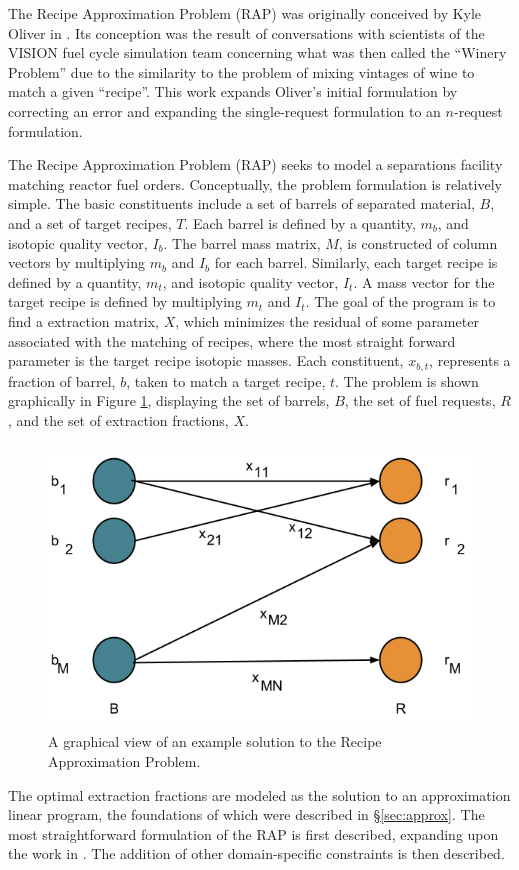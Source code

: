 The Recipe Approximation Problem (RAP) was originally conceived by Kyle Oliver
in \cite{oliver_geniusv2:_2009}. Its conception was the result of conversations
with scientists of the VISION fuel cycle simulation team \cite{vision2009}
concerning what was then called the ``Winery Problem'' due to the similarity to
the problem of mixing vintages of wine to match a given ``recipe''. This work
expands Oliver's initial formulation by correcting an error and expanding the
single-request formulation to an $n$-request formulation.

The Recipe Approximation Problem (RAP) seeks to model a separations facility
matching reactor fuel orders. Conceptually, the problem formulation is
relatively simple. The basic constituents include a set of barrels of separated
material, $B$, and a set of target recipes, $T$. Each barrel is defined by a
quantity, $m_b$, and isotopic quality vector, $I_b$. The barrel mass matrix,
$M$, is constructed of column vectors by multiplying $m_b$ and $I_b$ for each
barrel. Similarly, each target recipe is defined by a quantity, $m_t$, and
isotopic quality vector, $I_t$. A mass vector for the target recipe is defined
by multiplying $m_t$ and $I_t$. The goal of the program is to find a extraction
matrix, $X$, which minimizes the residual of some parameter associated with the
matching of recipes, where the most straight forward parameter is the target
recipe isotopic masses. Each constituent, $x_{b,t}$, represents a fraction of
barrel, $b$, taken to match a target recipe, $t$. The problem is shown
graphically in Figure \ref{fig:rap}, displaying the set of barrels, $B$, the set
of fuel requests, $R$, and the set of extraction fractions, $X$.

\begin{figure}[h]
  \begin{center}
    \includegraphics[height=7.5cm]{./chapters/research/rap.png}
  \caption{A graphical view of an example solution to the Recipe Approximation 
           Problem.}
  \label{fig:rap}
  \end{center}
\end{figure}

The optimal extraction fractions are modeled as the solution to an approximation
linear program, the foundations of which were described in
\S\ref{sec:approx}. The most straightforward formulation of the RAP is first
described, expanding upon the work in \cite{oliver_geniusv2:_2009}. The addition
of other domain-specific constraints is then described. 
